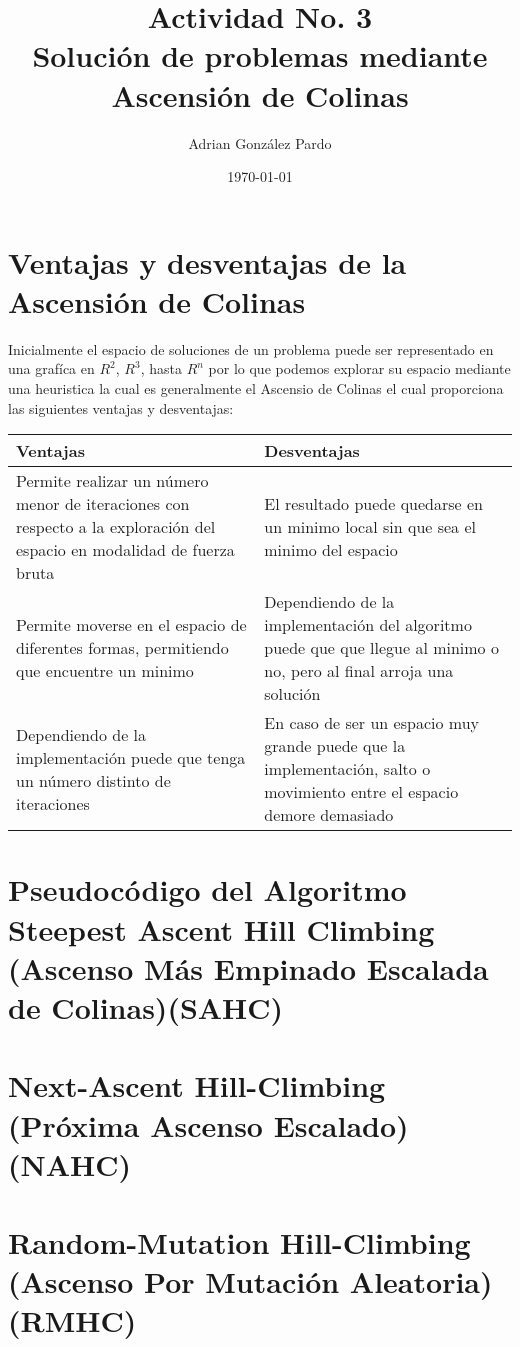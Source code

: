 \documentclass[10pt]{article}
\title{Actividad No. 3\\ Solución de problemas mediante Ascensión de Colinas}
\author{Adrian González Pardo}
\date{\today}
\begin{document}
\maketitle
\section{Ventajas y desventajas de la Ascensión de Colinas}
Inicialmente el espacio de soluciones de un problema puede ser representado en una grafíca en $R^{2}$, $R^{3}$, hasta $R^{n}$ por lo que podemos explorar su espacio mediante una heuristica la cual es generalmente el Ascensio de Colinas el cual proporciona las siguientes ventajas y desventajas:
\begin{center}
  \begin{tabular}{| p{6cm} | p{6cm} | }
    \hline
    Ventajas & Desventajas
    \\\hline
    Permite realizar un número menor de iteraciones con respecto a la exploración del espacio en modalidad de fuerza bruta & El resultado puede quedarse en un minimo local sin que sea el minimo del espacio\\
    \hline
    Permite moverse en el espacio de diferentes formas, permitiendo que encuentre un minimo & Dependiendo de la implementación del algoritmo puede que que llegue al minimo o no, pero al final arroja una solución\\\hline
    Dependiendo de la implementación puede que tenga un número distinto de iteraciones & En caso de ser un espacio muy grande puede que la implementación, salto o movimiento entre el espacio demore demasiado\\\hline
  \end{tabular}
\end{center}
\section{Pseudocódigo del Algoritmo Steepest Ascent Hill Climbing (Ascenso Más Empinado Escalada de Colinas)(SAHC)}

\section{Next-Ascent Hill-Climbing (Próxima Ascenso Escalado)(NAHC)}

\section{Random-Mutation Hill-Climbing (Ascenso Por Mutación Aleatoria)(RMHC)}

\end{document}
